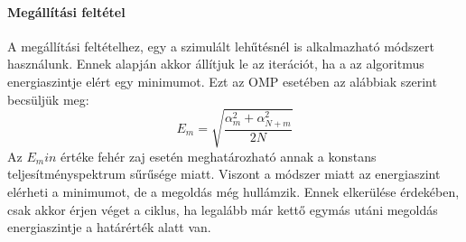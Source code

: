 \paragraph{Megállítási feltétel}
A megállítási feltételhez, egy a szimulált lehűtésnél is alkalmazható módszert használunk.
Ennek alapján akkor állítjuk le az iterációt, ha a az algoritmus energiaszintje elért egy minimumot. Ezt az OMP esetében az alábbiak szerint becsüljük meg:
\begin{equation}
    E_m = \sqrt{\frac{\alpha_m^2 + \alpha_{N + m}^2}{2N}}
\end{equation}
Az $E_min$ értéke fehér zaj esetén meghatározható annak a konstans teljesítményspektrum sűrűsége miatt. Viszont a módszer miatt az energiaszint elérheti a minimumot, de a megoldás még hullámzik. Ennek elkerülése érdekében, csak akkor érjen véget a ciklus, ha legalább már kettő egymás utáni megoldás energiaszintje a határérték alatt van.\cite{noise_reduction_omp}